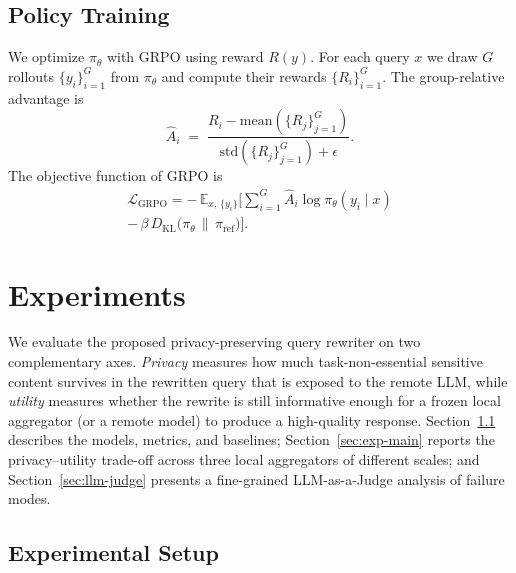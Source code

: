 \subsection{Policy Training}
\label{sec:policy}

We optimize $\pi_\theta$ with GRPO using reward $R(y)$. For each
query $x$ we draw $G$ rollouts $\{y_i\}_{i=1}^{G}$ from $\pi_\theta$
and compute their rewards $\{R_i\}_{i=1}^{G}$. The group-relative
advantage is
\begin{equation}
  \hat{A}_i \;=\;
  \frac{R_i - \mathrm{mean}(\{R_j\}_{j=1}^{G})}
       {\mathrm{std}(\{R_j\}_{j=1}^{G}) + \epsilon}.
\end{equation}
The objective function of GRPO is
\begin{equation}
\begin{aligned}
  \mathcal{L}_{\text{GRPO}}
  = -\,\mathbb{E}_{x,\,\{y_i\}}\Biggl[
      \sum_{i=1}^{G} \hat{A}_i \log \pi_\theta(y_i \mid x) \\
      -\,\beta\, D_{\mathrm{KL}}\!\bigl(\pi_\theta \,\|\, \pi_{\text{ref}}\bigr)
  \Biggr].
\end{aligned}
\end{equation}

\section{Experiments}
\label{sec:experiments}

We evaluate the proposed privacy-preserving query rewriter on two
complementary axes. \emph{Privacy} measures how much
task-non-essential sensitive content survives in the rewritten query
that is exposed to the remote LLM, while \emph{utility} measures
whether the rewrite is still informative enough for a frozen local
aggregator (or a remote model) to produce a high-quality response.
Section~\ref{sec:exp-setup} describes the models, metrics, and
baselines; Section~\ref{sec:exp-main} reports the privacy--utility
trade-off across three local aggregators of different scales; and
Section~\ref{sec:llm-judge} presents a fine-grained LLM-as-a-Judge
analysis of failure modes.

\subsection{Experimental Setup}
\label{sec:exp-setup}

